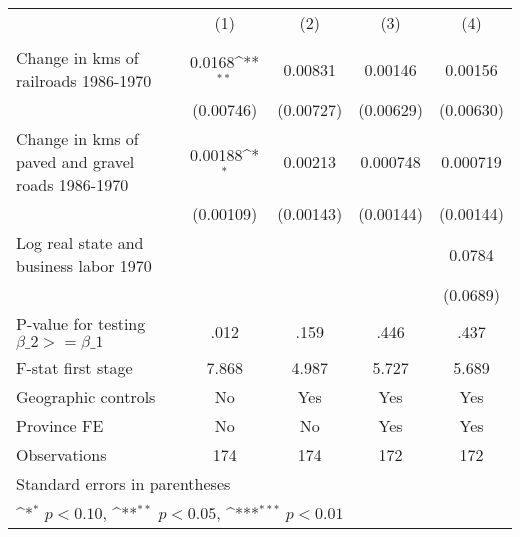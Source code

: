 {
\def\sym#1{\ifmmode^{#1}\else\(^{#1}\)\fi}
\begin{tabular}{l*{4}{c}}
\hline\hline
                &\multicolumn{1}{c}{(1)}&\multicolumn{1}{c}{(2)}&\multicolumn{1}{c}{(3)}&\multicolumn{1}{c}{(4)}\\
                &\multicolumn{1}{c}{}&\multicolumn{1}{c}{}&\multicolumn{1}{c}{}&\multicolumn{1}{c}{}\\
\hline
Change in kms of railroads 1986-1970&   0.0168\sym{**} &  0.00831         &  0.00146         &  0.00156         \\
                &(0.00746)         &(0.00727)         &(0.00629)         &(0.00630)         \\
[1em]
Change in kms of paved and gravel roads 1986-1970&  0.00188\sym{*}  &  0.00213         & 0.000748         & 0.000719         \\
                &(0.00109)         &(0.00143)         &(0.00144)         &(0.00144)         \\
[1em]
Log real state and business labor 1970&                  &                  &                  &   0.0784         \\
                &                  &                  &                  & (0.0689)         \\
\hline
P-value for testing $\beta\_{2} >= \beta\_{1}$&     .012         &     .159         &     .446         &     .437         \\
F-stat first stage&    7.868         &    4.987         &    5.727         &    5.689         \\
Geographic controls&       No         &      Yes         &      Yes         &      Yes         \\
Province FE     &       No         &       No         &      Yes         &      Yes         \\
Observations    &      174         &      174         &      172         &      172         \\
\hline\hline
\multicolumn{5}{l}{\footnotesize Standard errors in parentheses}\\
\multicolumn{5}{l}{\footnotesize \sym{*} \(p<0.10\), \sym{**} \(p<0.05\), \sym{***} \(p<0.01\)}\\
\end{tabular}
}
